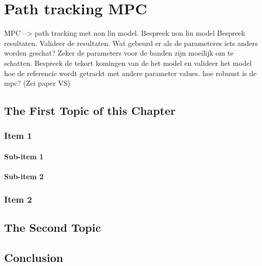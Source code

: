 \chapter{Path tracking MPC}
\label{cha:4}

MPC --> path tracking met non lin model.
Bespreek non lin model
Bespreek resultaten.
Valideer de resultaten. Wat gebeurd er als de parameteres iets anders worden geschat? Zeker de parameters voor de banden zijn moeilijk om te schatten. Bespreek de tekort komingen van de het model en valideer het model hoe de referencie wordt getrackt met andere parameter values. hoe robuust is de mpc?
(Zei paper VS)


\section{The First Topic of this Chapter}
\subsection{Item 1}
\subsubsection{Sub-item 1}


\subsubsection{Sub-item 2}


\subsection{Item 2}


\section{The Second Topic}


\section{Conclusion}

